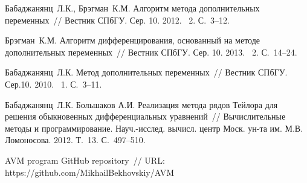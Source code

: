 \begin{thebibliography}{9} %

 Бабаджанянц~Л.К., Брэгман~К.М. Алгоритм метода дополнительных переменных~// Вестник СПбГУ. Сер. 10. 2012. \textnumero~2. С.~3--12.

 Брэгман~К.М. Алгоритм дифференцирования, основанный на методе дополнительных переменных~// Вестник СПбГУ. Сер. 10. 2013. \textnumero~2. С.~14--24.

 Бабаджанянц~Л.К. Метод дополнительных переменных~// Вестник СПбГУ. Сер.10. 2010. \textnumero~1. С.~3--11.

 Бабаджанянц~Л.К. Большаков А.И. Реализация метода рядов Тейлора для решения обыкновенных дифференциальных уравнений~// Вычислительные методы и программирование. Науч.-исслед. вычисл. центр Моск. ун-та им. М.В. Ломоносова. 2012. Т.~13. С.~497--510.

 AVM program GitHub repository~// URL: https://github.com/MikhailBekhovskiy/AVM
\end{thebibliography}





%

